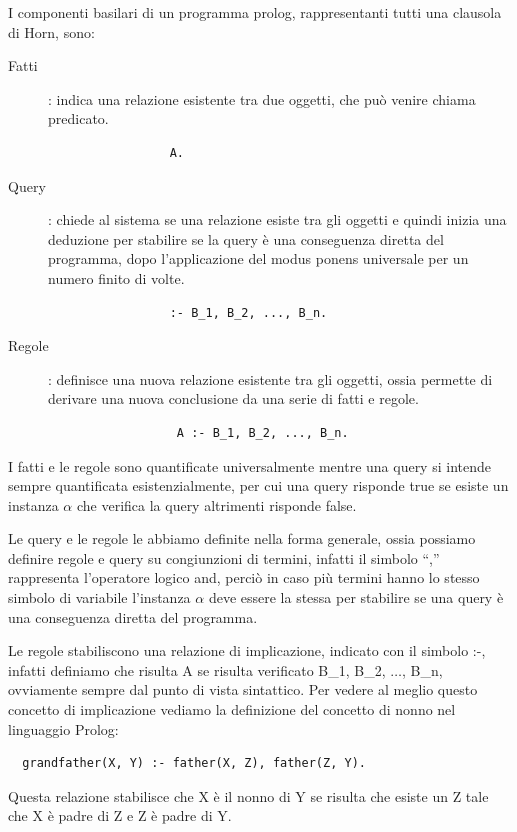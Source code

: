 \documentclass[a4paper]{report}
\begin{document}
I componenti basilari di un programma prolog, rappresentanti tutti una clausola di Horn, sono:
\begin{description}
\item [Fatti]: indica una relazione esistente tra due oggetti, che può venire chiama predicato.
               \begin{verbatim}
                 A.
               \end{verbatim}
\item [Query]: chiede al sistema se una relazione esiste tra gli oggetti e quindi inizia una deduzione per stabilire se la query
               è una conseguenza diretta del programma, dopo l'applicazione del modus ponens universale per un numero finito di volte.
               \begin{verbatim}
                 :- B_1, B_2, ..., B_n.
               \end{verbatim}
 
\item [Regole]: definisce una nuova relazione esistente tra gli oggetti, ossia permette di derivare una nuova conclusione
                da una serie di fatti e regole.
                \begin{verbatim}
                  A :- B_1, B_2, ..., B_n.
                \end{verbatim}
\end{description}
I fatti e le regole sono quantificate universalmente mentre una query si intende sempre quantificata esistenzialmente, per cui una query
risponde true se esiste un instanza $\alpha$ che verifica la query altrimenti risponde false.

Le query e le regole le abbiamo definite nella forma generale, ossia possiamo definire regole e query su congiunzioni di termini,
infatti il simbolo ``,'' rappresenta l'operatore logico and, perciò in caso più termini hanno lo stesso simbolo di variabile
l'instanza $\alpha$ deve essere la stessa per stabilire se una query è una conseguenza diretta del programma.

Le regole stabiliscono una relazione di implicazione, indicato con il simbolo :-, infatti definiamo che risulta A se risulta verificato
B_1, B_2, $\dots$, B_n, ovviamente sempre dal punto di vista sintattico.
Per vedere al meglio questo concetto di implicazione vediamo la definizione del concetto di nonno nel linguaggio Prolog:
\begin{verbatim}
  grandfather(X, Y) :- father(X, Z), father(Z, Y).
\end{verbatim}
Questa relazione stabilisce che X è il nonno di Y se risulta che esiste un Z tale che X è padre di Z e Z è padre di Y.
\end{document}
